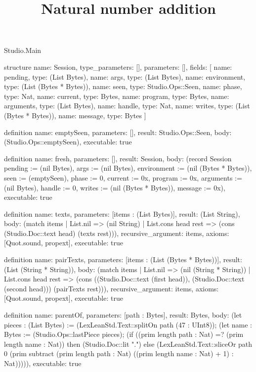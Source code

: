 \begin{lexlean}{Studio.Main}
\title{Natural number addition}
\begin{semanticmodule}
structure{
  name: Session,
  type_parameters: [],
  parameters: [],
  fields: [
    {name: pending, type: (List Bytes)},
    {name: args, type: (List Bytes)},
    {name: environment, type: (List (Bytes * Bytes))},
    {name: seen, type: Studio.Ops::Seen},
    {name: phase, type: Nat},
    {name: current, type: Bytes},
    {name: program, type: Bytes},
    {name: arguments, type: (List Bytes)},
    {name: handle, type: Nat},
    {name: writes, type: (List (Bytes * Bytes))},
    {name: message, type: Bytes}
  ]
}

definition{
  name: emptySeen,
  parameters: [],
  result: Studio.Ops::Seen,
  body: (Studio.Ops::emptySeen),
  executable: true
}

definition{
  name: fresh,
  parameters: [],
  result: Session,
  body: (record Session {pending := (nil Bytes), args := (nil Bytes), environment := (nil (Bytes * Bytes)), seen := (emptySeen), phase := 0, current := 0x, program := 0x, arguments := (nil Bytes), handle := 0, writes := (nil (Bytes * Bytes)), message := 0x}),
  executable: true
}

definition{
  name: texts,
  parameters: [items : (List Bytes)],
  result: (List String),
  body: (match items
    | List.nil => (nil String)
    | List.cons head rest => (cons (Studio.Doc::text head) (texts rest))),
  recursive_argument: items,
  axioms: [Quot.sound, propext],
  executable: true
}

definition{
  name: pairTexts,
  parameters: [items : (List (Bytes * Bytes))],
  result: (List (String * String)),
  body: (match items
    | List.nil => (nil (String * String))
    | List.cons head rest => (cons ((Studio.Doc::text (first head)), (Studio.Doc::text (second head))) (pairTexts rest))),
  recursive_argument: items,
  axioms: [Quot.sound, propext],
  executable: true
}

definition{
  name: parentOf,
  parameters: [path : Bytes],
  result: Bytes,
  body: (let pieces : (List Bytes) := (LexLeanStd.Text::splitOn path (47 : UInt8)); (let name : Bytes := (Studio.Ops::lastPiece pieces); (if ((prim length path : Nat) =? (prim length name : Nat)) then (Studio.Doc::lit ".") else (LexLeanStd.Text::sliceOr path 0 (prim subtract (prim length path : Nat) ((prim length name : Nat) + 1) : Nat))))),
  executable: true
}


\end{semanticmodule}
\end{lexlean}
